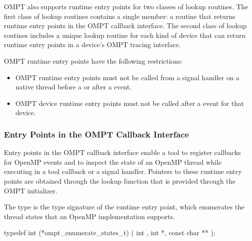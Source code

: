 OMPT also supports runtime entry points for two classes of lookup routines. The 
first class of lookup routines contains a single member: a routine that returns 
runtime entry points in the OMPT callback interface. The second class of lookup 
routines includes a unique lookup routine for each kind of device that can return 
runtime entry points in a device's OMPT tracing interface.

\restrictions

OMPT runtime entry points have the following restrictions:

\begin{itemize}
\item OMPT runtime entry points must not be called from a signal handler
      on a native thread before a  or after a 
       event.
\item OMPT device runtime entry points must not be called after a 
       event for that device.
\end{itemize}



\subsubsection{Entry Points in the OMPT Callback Interface}
\label{sec:ompt-callback-entry-points}

Entry points in the OMPT callback interface enable a tool to register callbacks 
for OpenMP events and to inspect the state of an OpenMP thread while executing 
in a tool callback or a signal handler. Pointers to these runtime entry points 
are obtained through the lookup function that is provided through the OMPT initializer.

\label{sec:ompt_enumerate_states_t}
\label{sec:ompt_enumerate_states}

\summary
The  type is the type signature of 
the  runtime entry point, which
enumerates the thread states that an OpenMP implementation supports.

\format
\begin{ccppspecific}
\begin{omptInquiry}
typedef int (*ompt_enumerate_states_t) (
  int ,
  int *,
  const char **
);
\end{omptInquiry}
\end{ccppspecific}

